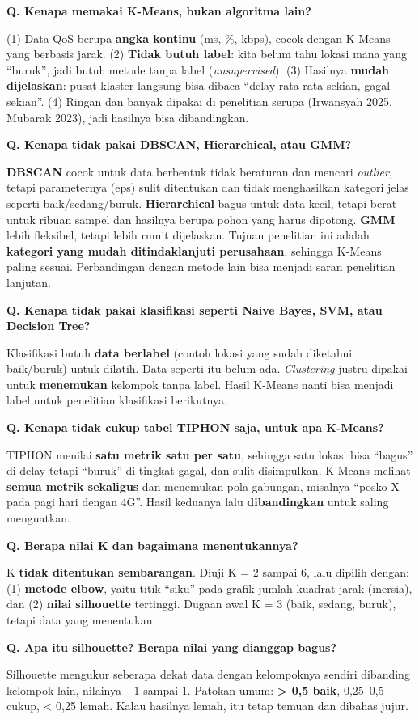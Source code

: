 \documentclass[11pt,a4paper]{article}
\newcounter{q}
\newcommand{\tanya}[2]{\stepcounter{q}%
\par\vspace{6pt}\noindent\colorbox{band}{\parbox{\dimexpr\linewidth-2\fboxsep}{\textbf{Q\arabic{q}. #1}}}\par\vspace{2pt}#2\par}
\begin{document}
\tanya{Kenapa memakai K-Means, bukan algoritma lain?}{(1) Data QoS berupa \textbf{angka kontinu} (ms, \%, kbps), cocok dengan K-Means yang berbasis jarak. (2) \textbf{Tidak butuh label}: kita belum tahu lokasi mana yang ``buruk'', jadi butuh metode tanpa label (\textit{unsupervised}). (3) Hasilnya \textbf{mudah dijelaskan}: pusat klaster langsung bisa dibaca ``delay rata-rata sekian, gagal sekian''. (4) Ringan dan banyak dipakai di penelitian serupa (Irwansyah 2025, Mubarak 2023), jadi hasilnya bisa dibandingkan.}

\tanya{Kenapa tidak pakai DBSCAN, Hierarchical, atau GMM?}{\textbf{DBSCAN} cocok untuk data berbentuk tidak beraturan dan mencari \textit{outlier}, tetapi parameternya (eps) sulit ditentukan dan tidak menghasilkan kategori jelas seperti baik/sedang/buruk. \textbf{Hierarchical} bagus untuk data kecil, tetapi berat untuk ribuan sampel dan hasilnya berupa pohon yang harus dipotong. \textbf{GMM} lebih fleksibel, tetapi lebih rumit dijelaskan. Tujuan penelitian ini adalah \textbf{kategori yang mudah ditindaklanjuti perusahaan}, sehingga K-Means paling sesuai. Perbandingan dengan metode lain bisa menjadi saran penelitian lanjutan.}

\tanya{Kenapa tidak pakai klasifikasi seperti Naive Bayes, SVM, atau Decision Tree?}{Klasifikasi butuh \textbf{data berlabel} (contoh lokasi yang sudah diketahui baik/buruk) untuk dilatih. Data seperti itu belum ada. \textit{Clustering} justru dipakai untuk \textbf{menemukan} kelompok tanpa label. Hasil K-Means nanti bisa menjadi label untuk penelitian klasifikasi berikutnya.}

\tanya{Kenapa tidak cukup tabel TIPHON saja, untuk apa K-Means?}{TIPHON menilai \textbf{satu metrik satu per satu}, sehingga satu lokasi bisa ``bagus'' di delay tetapi ``buruk'' di tingkat gagal, dan sulit disimpulkan. K-Means melihat \textbf{semua metrik sekaligus} dan menemukan pola gabungan, misalnya ``posko X pada pagi hari dengan 4G''. Hasil keduanya lalu \textbf{dibandingkan} untuk saling menguatkan.}

\tanya{Berapa nilai K dan bagaimana menentukannya?}{K \textbf{tidak ditentukan sembarangan}. Diuji K = 2 sampai 6, lalu dipilih dengan: (1) \textbf{metode elbow}, yaitu titik ``siku'' pada grafik jumlah kuadrat jarak (inersia), dan (2) \textbf{nilai silhouette} tertinggi. Dugaan awal K = 3 (baik, sedang, buruk), tetapi data yang menentukan.}

\tanya{Apa itu silhouette? Berapa nilai yang dianggap bagus?}{Silhouette mengukur seberapa dekat data dengan kelompoknya sendiri dibanding kelompok lain, nilainya $-1$ sampai $1$. Patokan umum: \textbf{> 0,5 baik}, 0,25--0,5 cukup, < 0,25 lemah. Kalau hasilnya lemah, itu tetap temuan dan dibahas jujur.}
\end{document}
